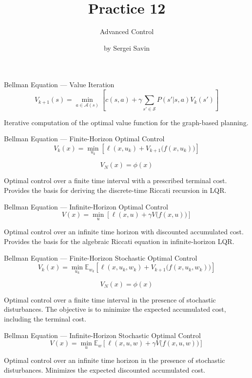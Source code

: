 \documentclass{beamer}
\subtitle{Advanced Control}
\author{by Sergei Savin}
\date{\mydate}
\title{Practice 12}
\begin{document}
\maketitle



\begin{frame}{Bellman Equation --- Value Iteration}
	\[
	V_{k+1}(s)
	=
	\min_{a\in\mathcal{A}(s)}
	\left[
	c(s,a)
	+
	\gamma
	\sum_{s'\in\mathcal{S}}
	P(s'|s,a)V_k(s')
	\right]
	\]
	
	\vfill
	\small
	Iterative computation of the optimal value function for the graph-based planning.
\end{frame}


\begin{frame}{Bellman Equation --- Finite-Horizon Optimal Control}
	\[
	V_k(x)
	=
	\min_{u_k}
	\left[
	\ell(x,u_k)
	+
	V_{k+1}\big(f(x,u_k)\big)
	\right]
	\]
	
	\[
	V_N(x)=\phi(x)
	\]
	
	\vfill
	\small
	Optimal control over a finite time interval with a prescribed terminal cost.
	Provides the basis for deriving the discrete-time Riccati recursion in LQR.
\end{frame}


\begin{frame}{Bellman Equation --- Infinite-Horizon Optimal Control}
	\[
	V(x)
	=
	\min_{u}
	\left[
	\ell(x,u)
	+
	\gamma V\big(f(x,u)\big)
	\right]
	\]
	
	\vfill
	\small
	Optimal control over an infinite time horizon with discounted accumulated cost.
	Provides the basis for the algebraic Riccati equation in infinite-horizon LQR.
\end{frame}


\begin{frame}{Bellman Equation --- Finite-Horizon Stochastic Optimal Control}
	\[
	V_k(x)
	=
	\min_{u_k}
	\mathbb{E}_{w_k}
	\left[
	\ell(x,u_k,w_k)
	+
	V_{k+1}\big(f(x,u_k,w_k)\big)
	\right]
	\]
	
	\[
	V_N(x)=\phi(x)
	\]
	
	\vfill
	\small
	Optimal control over a finite time interval in the presence of stochastic disturbances.
	The objective is to minimize the expected accumulated cost, including the terminal cost.
\end{frame}


\begin{frame}{Bellman Equation --- Infinite-Horizon Stochastic Optimal Control}
	\[
	V(x)
	=
	\min_{u}
	\mathbb{E}_{w}
	\left[
	\ell(x,u,w)
	+
	\gamma V\big(f(x,u,w)\big)
	\right]
	\]
	
	\vfill
	\small
	Optimal control over an infinite time horizon in the presence of stochastic disturbances.
	Minimizes the expected discounted accumulated cost.
\end{frame}




\myqrframe
\end{document}
